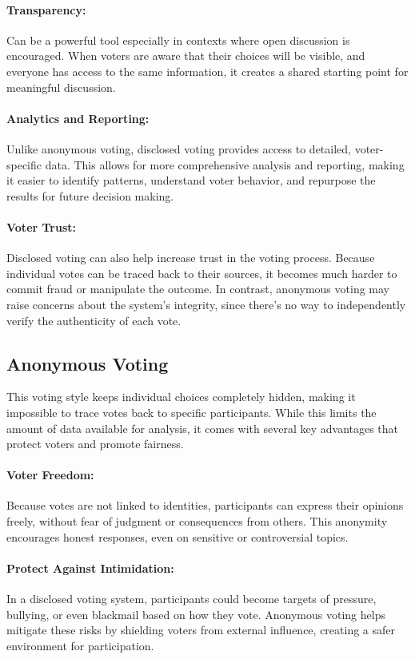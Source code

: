 \documentclass[a4paper,12pt]{report}
\begin{document}
\paragraph{Transparency:}
Can be a powerful tool especially in contexts where open discussion is encouraged. When voters are aware that their choices will be visible, and everyone has access to the same information, it creates a shared starting point for meaningful discussion.
\paragraph{Analytics and Reporting:}
Unlike anonymous voting, disclosed voting provides access to detailed, voter-specific data. This allows for more comprehensive analysis and reporting, making it easier to identify patterns, understand voter behavior, and repurpose the results for future decision making.
\paragraph{Voter Trust:}
Disclosed voting can also help increase trust in the voting process. Because individual votes can be traced back to their sources, it becomes much harder to commit fraud or manipulate the outcome. In contrast, anonymous voting may raise concerns about the system’s integrity, since there’s no way to independently verify the authenticity of each vote. \parencite{disvsanon}
\subsection{Anonymous Voting}
This voting style keeps individual choices completely hidden, making it impossible to trace votes back to specific participants. While this limits the amount of data available for analysis, it comes with several key advantages that protect voters and promote fairness.
\paragraph{Voter Freedom:}
Because votes are not linked to identities, participants can express their opinions freely, without fear of judgment or consequences from others. This anonymity encourages honest responses, even on sensitive or controversial topics.
\paragraph{Protect Against Intimidation:}
In a disclosed voting system, participants could become targets of pressure, bullying, or even blackmail based on how they vote. Anonymous voting helps mitigate these risks by shielding voters from external influence, creating a safer environment for participation.
\end{document}
